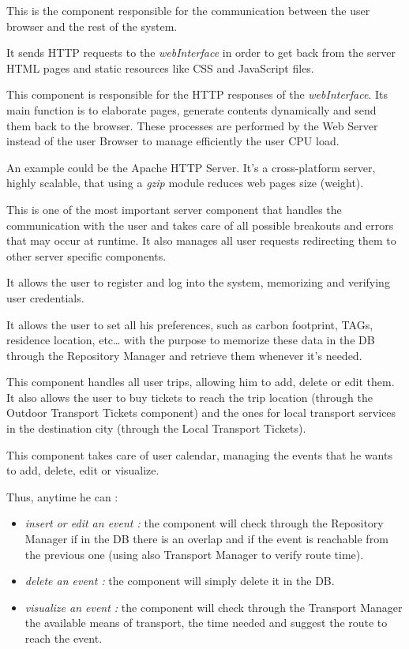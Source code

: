 This is the component responsible for the communication between the user browser and the rest of the system.\par
It sends HTTP requests to the \emph{webInterface} in order to get back from the server HTML pages and static resources like CSS and JavaScript files.

This component is responsible for the HTTP responses of the \emph{webInterface}. Its main function is to elaborate pages, generate contents dynamically and send them back to the browser. These processes are performed by the Web Server instead of the user Browser to manage efficiently the user CPU load.\par
An example could be the Apache HTTP Server. It’s a cross-platform server, highly scalable, that using a \emph{gzip} module reduces web pages size (weight).

This is one of the most important server component that handles the communication with the user and takes care of all possible breakouts and errors that may occur at runtime. It also manages all user requests redirecting them to other server specific components.

It allows the user to register and log into the system, memorizing and verifying user credentials.

It allows the user to set all his preferences, such as carbon footprint, TAGs, residence location, etc… with the purpose to memorize these data in the DB through the Repository Manager and retrieve them whenever it's needed.

This component handles all user trips, allowing him to add, delete or edit them. It also allows the user to buy tickets to reach the trip location (through the Outdoor Transport Tickets component) and the ones for local transport services in the destination city (through the Local Transport Tickets).

\newpage
{}
This component takes care of user calendar, managing the events that he wants to add, delete, edit or visualize.\par
Thus, anytime he can :
\begin{itemize}
	\setlength{\leftskip}{1cm}
	\item \emph{insert or edit an event :} the component will check through the Repository Manager if in the DB there is an overlap and if the event is reachable from the previous one (using also Transport Manager to verify route time).
	\item \emph{delete an event :} the component will simply delete it in the DB.
	\item \emph{visualize an event :} the component will check through the Transport Manager the available means of transport, the time needed and suggest the route to reach the event.
\end{itemize}

